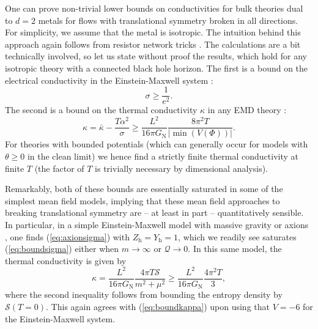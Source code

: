 \documentclass[10pt, oneside]{book}
\begin{document}
\begin{doublespace}
One can prove non-trivial lower bounds on conductivities for bulk theories dual to $d=2$ metals for flows with translational symmetry broken in all directions.  For simplicity, we assume that the metal is isotropic.   The intuition behind this approach again follows from resistor network tricks \cite{Lucas:2015lna}.
The calculations are a bit technically involved, so let us state without proof the results, which hold for any isotropic theory with a connected black hole horizon.   The first is a bound on the electrical conductivity in the Einstein-Maxwell system \cite{Grozdanov:2015qia}: \begin{equation}
\sigma \ge \frac{1}{e^2}.   \label{eq:boundsigma}
\end{equation}
The second is a bound on the thermal conductivity $\kappa$ in any EMD theory \cite{Grozdanov2}: \begin{equation}
\kappa = \bar\kappa - \frac{T\alpha^2}{\sigma} \ge \frac{L^2}{16\pi G_{\mathrm{N}}} \frac{8\pi^2 T}{|\min(V(\Phi))|}.   \label{eq:boundkappa}
\end{equation}
For theories with bounded potentials (which can generally occur for models with $\theta \ge 0$ in the clean limit) we hence find a strictly finite thermal conductivity at finite $T$ (the factor of $T$ is trivially necessary by dimensional analysis).

Remarkably, both of these bounds are essentially saturated in some of the simplest mean field models, implying that these mean field approaches to breaking translational symmetry are -- at least in part -- quantitatively sensible.   In particular, in a simple Einstein-Maxwell model with massive gravity \cite{Blake:2013bqa} or axions \cite{Andrade:2013gsa}, one finds (\ref{eq:axionsigma}) with $Z_{\mathrm{h}}=Y_{\mathrm{h}}=1$, which we readily see saturates (\ref{eq:boundsigma}) either when $m\rightarrow \infty$ or $\mathcal{Q}\rightarrow 0$.    In this same model, the thermal conductivity is given by \cite{Donos:2014cya} \begin{equation}
\kappa = \frac{L^2}{16\pi G_{\mathrm{N}}} \frac{4\pi T\mathcal{S}}{m^2 + \mu^2} \ge  \frac{L^2}{16\pi G_{\mathrm{N}}} \frac{4\pi^2 T}{3},
\end{equation}
where the second inequality follows from bounding the entropy density by $\mathcal{S}(T=0)$.   This again agrees with (\ref{eq:boundkappa}) upon using that $V=-6$ for the Einstein-Maxwell system.


\end{doublespace}
\end{document}
